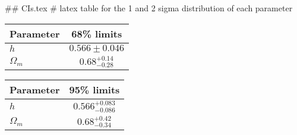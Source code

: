 ## CIs.tex
# latex table for the 1 and 2 sigma distribution of each parameter

\begin{tabular} { l  c}
 Parameter &  68\% limits\\
\hline
{\boldmath$h              $} & $0.566\pm 0.046            $\\
{\boldmath$\Omega_m       $} & $0.68^{+0.14}_{-0.28}      $\\
\hline
\end{tabular}

\begin{tabular} { l  c}
 Parameter &  95\% limits\\
\hline
{\boldmath$h              $} & $0.566^{+0.083}_{-0.086}   $\\
{\boldmath$\Omega_m       $} & $0.68^{+0.42}_{-0.34}      $\\
\hline
\end{tabular}
